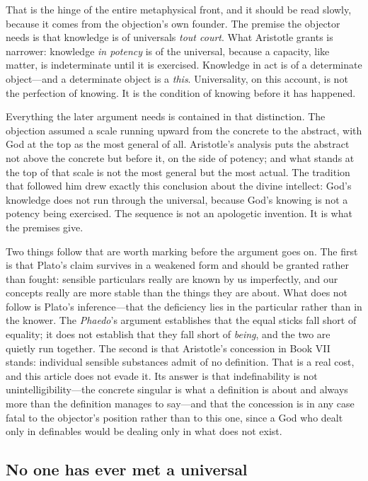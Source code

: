That is the hinge of the entire metaphysical front, and it should be read slowly, because it comes from the objection's own founder. The premise the objector needs is that knowledge is of universals \emph{tout court}. What Aristotle grants is narrower: knowledge \emph{in potency} is of the universal, because a capacity, like matter, is indeterminate until it is exercised. Knowledge in act is of a determinate object---and a determinate object is a \emph{this}. Universality, on this account, is not the perfection of knowing. It is the condition of knowing before it has happened.

Everything the later argument needs is contained in that distinction. The objection assumed a scale running upward from the concrete to the abstract, with God at the top as the most general of all. Aristotle's analysis puts the abstract not above the concrete but before it, on the side of potency; and what stands at the top of that scale is not the most general but the most actual. The tradition that followed him drew exactly this conclusion about the divine intellect: God's knowledge does not run through the universal, because God's knowing is not a potency being exercised. The sequence is not an apologetic invention. It is what the premises give.

Two things follow that are worth marking before the argument goes on. The first is that Plato's claim survives in a weakened form and should be granted rather than fought: sensible particulars really are known by us imperfectly, and our concepts really are more stable than the things they are about. What does not follow is Plato's inference---that the deficiency lies in the particular rather than in the knower. The \emph{Phaedo}'s argument establishes that the equal sticks fall short of equality; it does not establish that they fall short of \emph{being}, and the two are quietly run together. The second is that Aristotle's concession in Book VII stands: individual sensible substances admit of no definition. That is a real cost, and this article does not evade it. Its answer is that indefinability is not unintelligibility---the concrete singular is what a definition is about and always more than the definition manages to say---and that the concession is in any case fatal to the objector's position rather than to this one, since a God who dealt only in definables would be dealing only in what does not exist.

\subsection{No one has ever met a universal}

